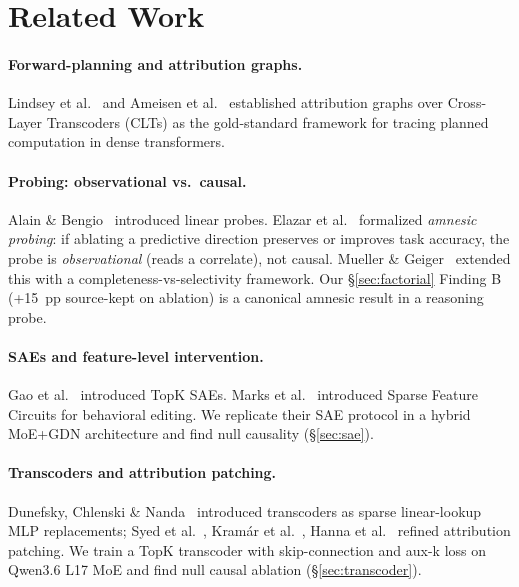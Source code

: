 \documentclass[11pt]{article}
\begin{document}
\section{Related Work}

\paragraph{Forward-planning and attribution graphs.} Lindsey et al.~\cite{lindsey2025biology} and Ameisen et al.~\cite{ameisen2025circuits} established attribution graphs over Cross-Layer Transcoders (CLTs) as the gold-standard framework for tracing planned computation in dense transformers.

\paragraph{Probing: observational vs.\ causal.} Alain \& Bengio~\cite{alain2018understanding} introduced linear probes. Elazar et al.~\cite{elazar2021amnesic} formalized \emph{amnesic probing}: if ablating a predictive direction preserves or improves task accuracy, the probe is \emph{observational} (reads a correlate), not causal. Mueller \& Geiger~\cite{mueller2024reliability} extended this with a completeness-vs-selectivity framework. Our \S\ref{sec:factorial} Finding B (+15~pp source-kept on ablation) is a canonical amnesic result in a reasoning probe.

\paragraph{SAEs and feature-level intervention.} Gao et al.~\cite{gao2024scaling} introduced TopK SAEs. Marks et al.~\cite{marks2024sparse} introduced Sparse Feature Circuits for behavioral editing. We replicate their SAE protocol in a hybrid MoE+GDN architecture and find null causality (\S\ref{sec:sae}).

\paragraph{Transcoders and attribution patching.} Dunefsky, Chlenski \& Nanda~\cite{dunefsky2024transcoders} introduced transcoders as sparse linear-lookup MLP replacements; Syed et al.~\cite{syed2024attribution}, Kram\'{a}r et al.~\cite{kramar2024atp}, Hanna et al.~\cite{hanna2024eapig} refined attribution patching. We train a TopK transcoder with skip-connection and aux-k loss on Qwen3.6 L17 MoE and find null causal ablation (\S\ref{sec:transcoder}).
\end{document}

